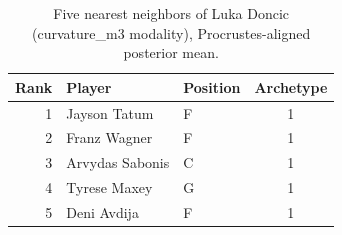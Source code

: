 \begin{table}[htbp]
  \centering\small
  \begin{tabular}{rllc}
    \toprule
    Rank & Player & Position & Archetype \\
    \midrule
    1 & Jayson Tatum & F & 1 \\
    2 & Franz Wagner & F & 1 \\
    3 & Arvydas Sabonis & C & 1 \\
    4 & Tyrese Maxey & G & 1 \\
    5 & Deni Avdija & F & 1 \\
    \bottomrule
  \end{tabular}
  \caption{Five nearest neighbors of Luka Doncic (curvature_m3 modality), Procrustes-aligned posterior mean.}
  \label{tab:Luka_Doncic_neighbors_curvature_m3}
\end{table}

